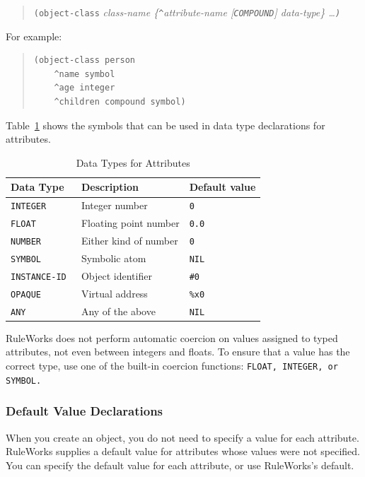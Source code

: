\begin{quote}
  \verb|(object-class| \it{class-name} \{\verb|^|\it{attribute-name}
    [\verb|COMPOUND|] \it{data-type}\} \ldots \verb|)|
\end{quote}

For example:

\begin{quote}
\begin{verbatim}
(object-class person
    ^name symbol
    ^age integer
    ^children compound symbol)
\end{verbatim}
\end{quote}

Table~\ref{t:2-2} shows the symbols that can be used in data type
declarations for attributes.

\begin{table}[h]
  \centering
  \begin{tabular}{lll}
    \toprule
    Data Type & Description & Default value \\
    \midrule
    \tt{INTEGER}     & Integer number        & \tt{0} \\
    \tt{FLOAT}       & Floating point number & \tt{0.0} \\
    \tt{NUMBER}      & Either kind of number & \tt{0} \\
    \tt{SYMBOL}      & Symbolic atom         & \tt{NIL} \\
    \tt{INSTANCE-ID} & Object identifier     & \verb|#0| \\
    \tt{OPAQUE}      & Virtual address       & \verb|%x0| \\
    \tt{ANY}         & Any of the above      & \tt{NIL} \\  
    \bottomrule
  \end{tabular}
  \caption{Data Types for Attributes}
  \label{t:2-2}
\end{table}

RuleWorks does not perform automatic coercion on values
assigned to typed attributes, not even between integers and
floats. To ensure that a value has the correct type, use one
of the built-in coercion functions: \tt{FLOAT}, \tt{INTEGER}, or
\tt{SYMBOL}.

\subsubsection{Default Value Declarations}

When you create an object, you do not need to specify a value
for each attribute. RuleWorks supplies a default value for
attributes whose values were not specified. You can specify
the default value for each attribute, or use RuleWorks's
default.

